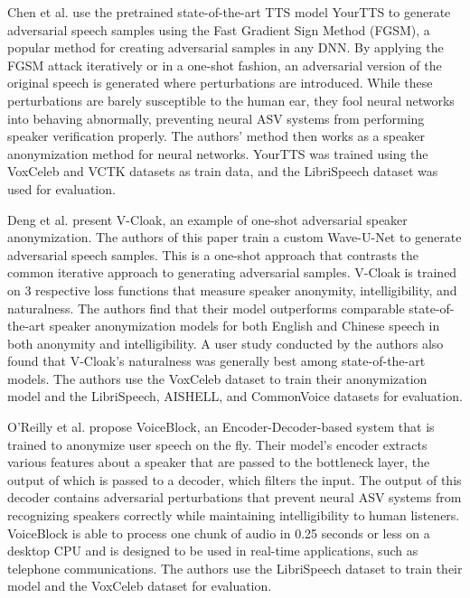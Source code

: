 \documentclass{Interspeech2024}
\begin{document}
Chen et al. \cite{chen_2024_adversarial_yourtts} use the pretrained state-of-the-art TTS model YourTTS to generate adversarial speech samples using the Fast Gradient Sign Method (FGSM), a popular method for creating adversarial samples in any DNN. 
By applying the FGSM attack iteratively or in a one-shot fashion, an adversarial version of the original speech is generated where perturbations are introduced. 
While these perturbations are barely susceptible to the human ear, they fool neural networks into behaving abnormally, preventing neural ASV systems from performing speaker verification properly. 
The authors' method then works as a speaker anonymization method for neural networks.
YourTTS was trained using the VoxCeleb and VCTK datasets as train data, and the LibriSpeech dataset was used for evaluation.

Deng et al. \cite{deng_2023_v_cloak} present V-Cloak, an example of one-shot adversarial speaker anonymization. 
The authors of this paper train a custom Wave-U-Net to generate adversarial speech samples. 
This is a one-shot approach that contrasts the common iterative approach to generating adversarial samples. 
V-Cloak is trained on 3 respective loss functions that measure speaker anonymity, intelligibility, and naturalness. 
The authors find that their model outperforms comparable state-of-the-art speaker anonymization models for both English and Chinese speech in both anonymity and intelligibility. 
A user study conducted by the authors also found that V-Cloak's naturalness was generally best among state-of-the-art models.
The authors use the VoxCeleb dataset to train their anonymization model and the LibriSpeech, AISHELL, and CommonVoice datasets for evaluation.

O'Reilly et al. \cite{oreilly_2022_voiceblock} propose VoiceBlock, an Encoder-Decoder-based system that is trained to anonymize user speech on the fly. 
Their model's encoder extracts various features about a speaker that are passed to the bottleneck layer, the output of which is passed to a decoder, which filters the input.
The output of this decoder contains adversarial perturbations that prevent neural ASV systems from recognizing speakers correctly while maintaining intelligibility to human listeners.
VoiceBlock is able to process one chunk of audio in 0.25 seconds or less on a desktop CPU and is designed to be used in real-time applications, such as telephone communications.
The authors use the LibriSpeech dataset to train their model and the VoxCeleb dataset for evaluation.
\end{document}
